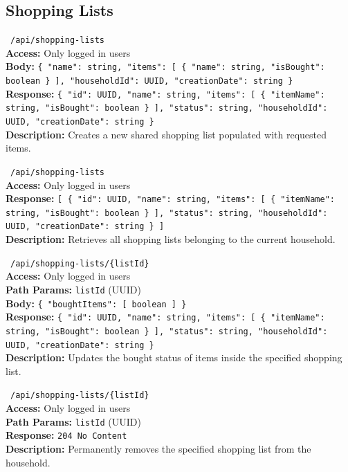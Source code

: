 \subsection{Shopping Lists}

\vspace{0.3cm}
\noindent \apiPOST\ \texttt{/api/shopping-lists} \\
\textbf{Access:} Only logged in users \\
\textbf{Body:} \texttt{\{ "name": string, "items": [ \{ "name": string, "isBought": boolean \} ], "householdId": UUID, "creationDate": string \}} \\
\textbf{Response:} \texttt{\{ "id": UUID, "name": string, "items": [ \{ "itemName": string, "isBought": boolean \} ], "status": string, "householdId": UUID, "creationDate": string \}} \\
\textbf{Description:} Creates a new shared shopping list populated with requested items.

\vspace{0.3cm}
\noindent \apiGET\ \texttt{/api/shopping-lists} \\
\textbf{Access:} Only logged in users \\
\textbf{Response:} \texttt{[ \{ "id": UUID, "name": string, "items": [ \{ "itemName": string, "isBought": boolean \} ], "status": string, "householdId": UUID, "creationDate": string \} ]} \\
\textbf{Description:} Retrieves all shopping lists belonging to the current household.

\vspace{0.3cm}
\noindent \apiPATCH\ \texttt{/api/shopping-lists/\{listId\}} \\
\textbf{Access:} Only logged in users \\
\textbf{Path Params:} \texttt{listId} (UUID) \\
\textbf{Body:} \texttt{\{ "boughtItems": [ boolean ] \}} \\
\textbf{Response:} \texttt{\{ "id": UUID, "name": string, "items": [ \{ "itemName": string, "isBought": boolean \} ], "status": string, "householdId": UUID, "creationDate": string \}} \\
\textbf{Description:} Updates the bought status of items inside the specified shopping list.

\vspace{0.3cm}
\noindent \apiDELETE\ \texttt{/api/shopping-lists/\{listId\}} \\
\textbf{Access:} Only logged in users \\
\textbf{Path Params:} \texttt{listId} (UUID) \\
\textbf{Response:} \texttt{204 No Content} \\
\textbf{Description:} Permanently removes the specified shopping list from the household.